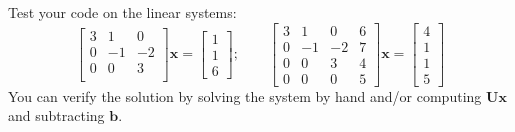 \begin{exercise}
    Test your code on the linear systems:
    \[
    \begin{bmatrix}
        3 & 1 & 0  \\
        0 & -1 & -2  \\
        0 & 0 & 3  \\
    \end{bmatrix} \mathbf{x} = \begin{bmatrix}
        1 \\ 1 \\ 6
    \end{bmatrix};
    \qquad
    \begin{bmatrix}
        3 & 1 & 0 & 6 \\
        0 & -1 & -2 & 7 \\
        0 & 0 & 3 & 4 \\
        0 & 0 & 0 & 5
    \end{bmatrix} \mathbf{x} = \begin{bmatrix}
        4 \\ 1 \\ 1 \\ 5
    \end{bmatrix}
    \]
    You can verify the solution by solving the system by hand and/or computing $\mathbf{U}\mathbf{x}$ and subtracting $\mathbf{b}$.
\end{exercise}

